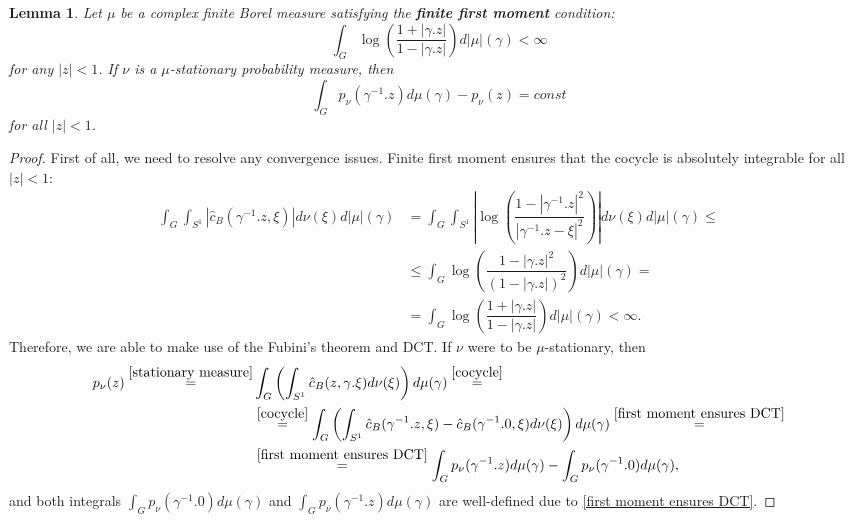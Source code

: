 \documentclass[11pt]{article}
\newtheorem{lemma}{Lemma}[section]
\begin{document}
\begin{lemma}
	Let $\mu$ be a complex finite Borel measure satisfying the \textbf{finite first moment} condition:
	\begin{equation}
		\label{E:finite first moment}
		\int_{G} \log\left( \dfrac{1 + |\gamma.z|}{1 - |\gamma.z|} \right) d |\mu|(\gamma)  < \infty
	\end{equation} 
	for any $|z| < 1$. If $\nu$ is a $\mu$-stationary probability measure, then
	\begin{equation}
		\label{Poisson stat}
		\int_{G} p_\nu(\gamma^{-1}.z) d \mu(\gamma) - p_\nu(z) = const
	\end{equation}
	for all $|z| < 1$.
\end{lemma}

\begin{proof}
	First of all, we need to resolve any convergence issues. Finite first moment ensures that the cocycle is absolutely integrable for all $|z| < 1$:
	\begin{equation}
		\label{first moment ensures DCT}
		\begin{aligned}
			\int_G \int_{S^1} |\hat{c}_B(\gamma^{-1}.z, \xi)| d\nu(\xi) d |\mu|(\gamma)  &= \int_G \int_{S^1} \left|  \log \left( \dfrac{1 - |\gamma^{-1}.z|^2}{|\gamma^{-1}.z - \xi|^2} \right) \right| d\nu(\xi)  d |\mu|(\gamma)  \le \\ 
			&\le \int_G   \log \left( \dfrac{1 - |\gamma.z|^2}{(1-|\gamma.z|)^2} \right) d|\mu|(\gamma) = \\ 
			&= \int_G  \log \left( \dfrac{1 + |\gamma.z|}{1-|\gamma.z|} \right) d|\mu|(\gamma) < \infty.
		\end{aligned}	
	\end{equation}
	Therefore, we are able to make use of the Fubini's theorem and DCT. If $\nu$ were to be $\mu$-stationary, then
	\[
	\begin{aligned}
		p_\nu(z) \stackrel{\eqref{stationary measure}}{=} & \int_{G} \left( \int_{S^1} \hat{c}_B(z, \gamma.\xi) d \nu(\xi) \right)  d \mu(\gamma) \stackrel{\eqref{cocycle}}{=} \\ 
		&\stackrel{\eqref{cocycle}}{=} \int_{G} \left( \int_{S^1} \hat{c}_B(\gamma^{-1}.z, \xi) - \hat{c}_B(\gamma^{-1}.0,\xi)  d \nu(\xi) \right)  d \mu(\gamma)  \stackrel{\eqref{first moment ensures DCT}}{=} \\
		&\stackrel{\eqref{first moment ensures DCT}}{=}  \int_{G} p_\nu(\gamma^{-1}.z) d \mu(\gamma)  - \int_{G}p_\nu(\gamma^{-1}.0)  d \mu(\gamma),
	\end{aligned}
	\]
	and both integrals $\int_{G}p_\nu(\gamma^{-1}.0)  d \mu(\gamma)$ and $\int_{G}p_\nu(\gamma^{-1}.z)  d \mu(\gamma)$ are well-defined due to \eqref{first moment ensures DCT}.
\end{proof}
\end{document}
